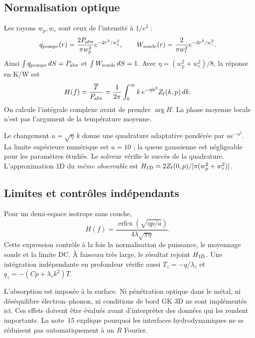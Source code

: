 \documentclass[11pt,a4paper]{article}
\begin{document}
\subsection{Normalisation optique}
Les rayons $w_p,w_r$ sont ceux de l'intensité à $1/e^2$ :
\[
 q_{\rm pompe}(r)=\frac{2P_{\rm abs}}{\pi w_p^2}e^{-2r^2/w_p^2},
 \qquad W_{\rm sonde}(r)=\frac{2}{\pi w_r^2}e^{-2r^2/w_r^2}.
\]
Ainsi $\int q_{\rm pompe}\,dS=P_{\rm abs}$ et $\int W_{\rm sonde}\,dS=1$.
Avec $\eta=(w_p^2+w_r^2)/8$, la réponse en K/W est
\[
 H(f)=\frac{\overline T}{P_{\rm abs}}
 =\frac1{2\pi}\int_0^\infty k\,e^{-\eta k^2} Z_t(k,p)\,dk .
\]
On calcule l'intégrale complexe avant de prendre $\arg H$.
La phase moyenne locale n'est pas l'argument de la température moyenne.

Le changement $u=\sqrt\eta\,k$ donne une quadrature adaptative pondérée
par $u e^{-u^2}$. La limite supérieure numérique est $u=10$ ;
la queue gaussienne est négligeable pour les paramètres étudiés.
Le solveur vérifie le succès de la quadrature.
L'approximation 1D du \emph{même observable} est
$H_{\rm 1D}=2Z_t(0,p)/[\pi(w_p^2+w_r^2)]$.

\subsection{Limites et contrôles indépendants}
Pour un demi-espace isotrope sans couche,
\[
 H(f)=\frac{\operatorname{erfcx}(\sqrt{\eta p/a})}
 {4\lambda\sqrt{\pi\eta}}.
\]
Cette expression contrôle à la fois la normalisation de puissance, le
moyennage sonde et la limite DC. À faisceau très large, le résultat rejoint
$H_{\rm 1D}$. Une intégration indépendante en profondeur vérifie aussi
$T_z=-q/\lambda_z$ et $q_z=-(Cp+\lambda_rk^2)T$.

L'absorption est imposée à la surface. Ni pénétration optique dans le métal,
ni déséquilibre électron--phonon, ni conditions de bord GK 3D ne sont
implémentés ici. Ces effets doivent être évalués avant d'interpréter des données
qui les rendent importants. La note~15 explique pourquoi les interfaces
hydrodynamiques ne se réduisent pas automatiquement à un $R$ Fourier.
\end{document}
